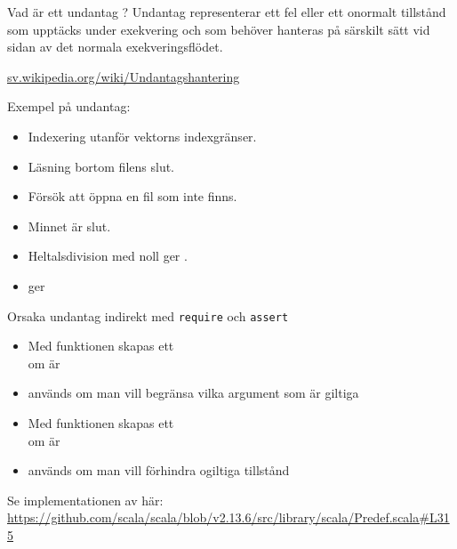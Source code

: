 \begin{Slide}{Vad är ett undantag ?}
Undantag representerar ett fel eller ett onormalt tillstånd som upptäcks under exekvering och som  behöver hanteras på särskilt sätt vid sidan av det normala exekveringsflödet.

\vspace{1em}\href{https://sv.wikipedia.org/wiki/Undantagshantering}{sv.wikipedia.org/wiki/Undantagshantering}


\vspace{1em} Exempel på undantag:

\pause

\begin{itemize} \SlideFontSmall
\item Indexering utanför vektorns indexgränser.

\item Läsning bortom filens slut.

\item Försök att öppna en fil som inte finns.

\item Minnet är slut.

\item Heltalsdivision med noll ger .

\item {} ger 

\end{itemize}

\end{Slide}


\begin{Slide}{Orsaka undantag indirekt med \texttt{require} och \texttt{assert}}

\begin{itemize}\SlideFontSmall
  \item Med funktionen  skapas ett  \\ om  är 
  \item {} används om man vill begränsa vilka argument som är giltiga
  \item Med funktionen  skapas ett  \\ om  är  
  \item {} används om man vill förhindra ogiltiga tillstånd
\end{itemize}
{
  \ifkompendium\else
  \vfill\SlideFontTiny
  \fi
  Se implementationen av  här:\\
\url{https://github.com/scala/scala/blob/v2.13.6/src/library/scala/Predef.scala#L315}
}
\end{Slide}

